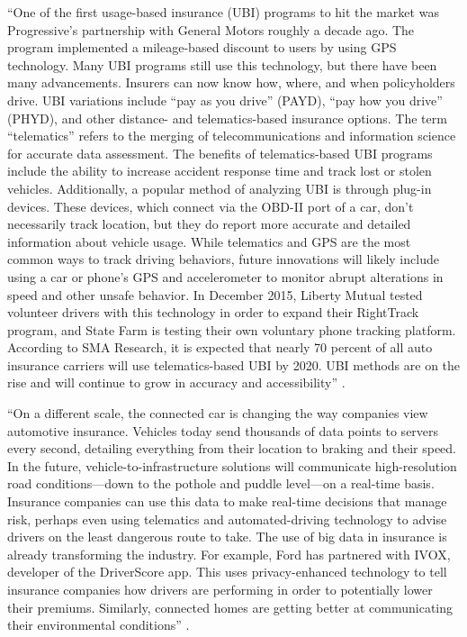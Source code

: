 ``One of the first usage-based insurance (UBI) programs to hit the market was Progressive’s partnership with General Motors roughly a decade ago. The program implemented a mileage-based discount to users by using GPS technology. Many UBI programs still use this technology, but there have been many advancements. Insurers can now know how, where, and when policyholders drive. UBI variations include “pay as you drive” (PAYD), “pay how you drive” (PHYD), and other distance- and telematics-based insurance options. The term “telematics” refers to the merging of telecommunications and information science for accurate data assessment. The benefits of telematics-based UBI programs include the ability to increase accident response time and track lost or stolen vehicles. Additionally, a popular method of analyzing UBI is through plug-in devices. These devices, which connect via the OBD-II port of a car, don’t necessarily track location, but they do report more accurate and detailed information about vehicle usage. While telematics and GPS are the most common ways to track driving behaviors, future innovations will likely include using a car or phone’s GPS and accelerometer to monitor abrupt alterations in speed and other unsafe behavior. In December 2015, Liberty Mutual tested volunteer drivers with this technology in order to expand their RightTrack program, and State Farm is testing their own voluntary phone tracking platform. According to SMA Research, it is expected that nearly 70 percent of all auto insurance carriers will use telematics-based UBI by 2020. UBI methods are on the rise and will continue to grow in accuracy and accessibility'' \cite{Firm2016insurance}.

``On a different scale, the connected car is changing the way companies view automotive insurance. Vehicles today send thousands of data points to servers every second, detailing everything from their location to braking and their speed. In the future, vehicle-to-infrastructure solutions will communicate high-resolution road conditions—down to the pothole and puddle level—on a real-time basis. Insurance companies can use this data to make real-time decisions that manage risk, perhaps even using telematics and automated-driving technology to advise drivers on the least dangerous route to take. The use of big data in insurance is already transforming the industry. For example, Ford has partnered with IVOX, developer of the DriverScore app. This uses privacy-enhanced technology to tell insurance companies how drivers are performing in order to potentially lower their premiums. Similarly, connected homes are getting better at communicating their environmental conditions'' \cite{Bradbury2017game}. 


